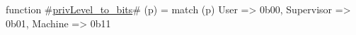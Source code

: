 function #\hyperref[sailRISCVzprivLevelzytozybits]{privLevel\_to\_bits}# (p) =
  match (p) {
    User       => 0b00,
    Supervisor => 0b01,
    Machine    => 0b11
  }
